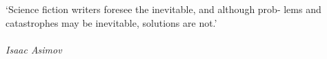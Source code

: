 
\clearpage

\narrowlinespacing

\vspace*{4mm}

`Science fiction writers foresee the inevitable, and although prob- lems and catastrophes may be inevitable, solutions are not.'\\
\\
\emph{Isaac Asimov}

\normallinespacing
